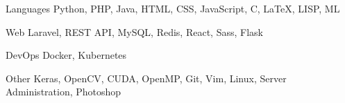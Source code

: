 

\begin{cvskills}

  \cvskill
    {Languages} %
    {Python, PHP, Java, HTML, CSS, JavaScript, C, \LaTeX, LISP, ML} %

  \cvskill
    {Web} %
    {Laravel, REST API, MySQL, Redis, React, Sass, Flask} %

  \cvskill
    {DevOps} %
    {Docker, Kubernetes} %

  \cvskill
    {Other} %
    {Keras, OpenCV, CUDA, OpenMP, Git, Vim, Linux, Server Administration, Photoshop} %

\end{cvskills}
